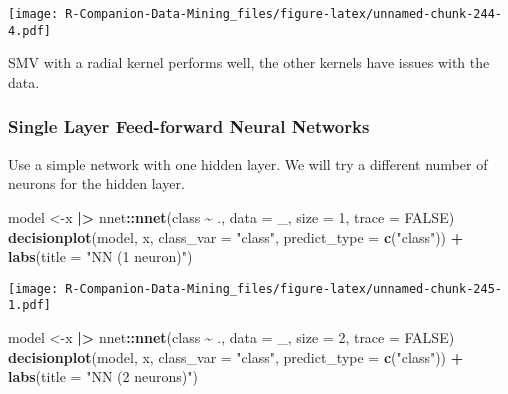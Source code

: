 \documentclass[
  notitlepage]{book}
\newenvironment{Shaded}{\begin{snugshade}}{\end{snugshade}}
\newcommand{\DataTypeTok}[1]{\textcolor[rgb]{0.13,0.29,0.53}{#1}}
\newcommand{\DecValTok}[1]{\textcolor[rgb]{0.00,0.00,0.81}{#1}}
\newcommand{\ErrorTok}[1]{\textcolor[rgb]{0.64,0.00,0.00}{\textbf{#1}}}
\newcommand{\KeywordTok}[1]{\textcolor[rgb]{0.13,0.29,0.53}{\textbf{#1}}}
\newcommand{\NormalTok}[1]{#1}
\newcommand{\OperatorTok}[1]{\textcolor[rgb]{0.81,0.36,0.00}{\textbf{#1}}}
\newcommand{\OtherTok}[1]{\textcolor[rgb]{0.56,0.35,0.01}{#1}}
\newcommand{\StringTok}[1]{\textcolor[rgb]{0.31,0.60,0.02}{#1}}
\begin{document}
\texttt{[image: R-Companion-Data-Mining\_files/figure-latex/unnamed-chunk-244-4.pdf]}

SMV with a radial kernel performs well, the other kernels have issues
with the data.

\hypertarget{single-layer-feed-forward-neural-networks-1}{%
\subsubsection{Single Layer Feed-forward Neural Networks}\label{single-layer-feed-forward-neural-networks-1}}

Use a simple network with one hidden layer. We will try a
different number of
neurons for the hidden layer.

\begin{Shaded}
\begin{Highlighting}[]
\NormalTok{model \textless{}{-}x }\OperatorTok{|}\ErrorTok{\textgreater{}}\StringTok{ }\NormalTok{nnet}\OperatorTok{::}\KeywordTok{nnet}\NormalTok{(class }\OperatorTok{\textasciitilde{}}\StringTok{ }\NormalTok{., }\DataTypeTok{data =}\NormalTok{ \_, }\DataTypeTok{size =} \DecValTok{1}\NormalTok{, }\DataTypeTok{trace =} \OtherTok{FALSE}\NormalTok{)}
\KeywordTok{decisionplot}\NormalTok{(model, x, }\DataTypeTok{class\_var =} \StringTok{"class"}\NormalTok{, }
  \DataTypeTok{predict\_type =} \KeywordTok{c}\NormalTok{(}\StringTok{"class"}\NormalTok{)) }\OperatorTok{+}\StringTok{ }\KeywordTok{labs}\NormalTok{(}\DataTypeTok{title =} \StringTok{"NN (1 neuron)"}\NormalTok{)}
\end{Highlighting}
\end{Shaded}

\texttt{[image: R-Companion-Data-Mining\_files/figure-latex/unnamed-chunk-245-1.pdf]}

\begin{Shaded}
\begin{Highlighting}[]
\NormalTok{model \textless{}{-}x }\OperatorTok{|}\ErrorTok{\textgreater{}}\StringTok{ }\NormalTok{nnet}\OperatorTok{::}\KeywordTok{nnet}\NormalTok{(class }\OperatorTok{\textasciitilde{}}\StringTok{ }\NormalTok{., }\DataTypeTok{data =}\NormalTok{ \_, }\DataTypeTok{size =} \DecValTok{2}\NormalTok{, }\DataTypeTok{trace =} \OtherTok{FALSE}\NormalTok{)}
\KeywordTok{decisionplot}\NormalTok{(model, x, }\DataTypeTok{class\_var =} \StringTok{"class"}\NormalTok{, }
  \DataTypeTok{predict\_type =} \KeywordTok{c}\NormalTok{(}\StringTok{"class"}\NormalTok{)) }\OperatorTok{+}\StringTok{ }\KeywordTok{labs}\NormalTok{(}\DataTypeTok{title =} \StringTok{"NN (2 neurons)"}\NormalTok{)}
\end{Highlighting}
\end{Shaded}
\end{document}

